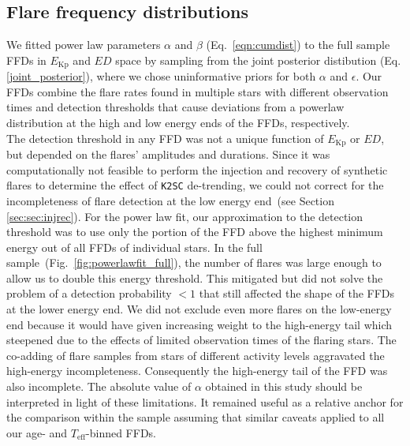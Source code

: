 \documentclass{aa}
\begin{document}
\subsection{Flare frequency distributions}
We fitted power law parameters $\alpha$ and $\beta$ (Eq.~\ref{eqn:cumdist}) to the full sample FFDs in $E_\mathrm{Kp}$ and $ED$ space by sampling from the joint posterior distibution (Eq. \ref{joint_posterior}), where we chose uninformative priors for both $\alpha$ and $\epsilon$. Our FFDs combine the flare rates found in multiple stars with different observation times and detection thresholds that cause deviations from a powerlaw distribution at the high and low energy ends of the FFDs, respectively.
\\
The detection threshold in any FFD was not a unique function of $E_\mathrm{Kp}$ or $ED$, but depended on the flares' amplitudes and durations. Since it was computationally not feasible to perform the injection and recovery of synthetic flares to determine the effect of \texttt{K2SC} de-trending, we could not correct for the incompleteness of flare detection at the low energy end~(see Section \ref{sec:sec:injrec}). For the power law fit, our approximation to the detection threshold was to use only the portion of the FFD above the highest minimum energy out of all FFDs of individual stars. In the full sample~(Fig.~\ref{fig:powerlawfit_full}), the number of flares was large enough to allow us to double this energy threshold. This mitigated but did not solve the problem of a detection probability $<1$ that still affected the shape of the FFDs at the lower energy end. We did not exclude even more flares on the low-energy end because it would have given increasing weight to the high-energy tail which steepened due to the effects of limited observation times of the flaring stars. The co-adding of flare samples from stars of different activity levels aggravated the high-energy incompleteness. Consequently the high-energy tail of the FFD was also incomplete. 
The absolute value of $\alpha$ obtained in this study should be interpreted in light of these limitations. It remained useful as a relative anchor for the comparison within the sample assuming that similar caveats applied to all our age- and $T_\mathrm{eff}$-binned FFDs.
\end{document}
